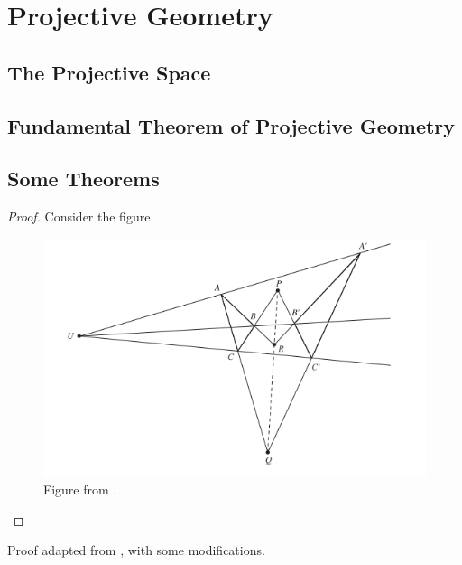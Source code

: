 \chapter{Projective Geometry}

\section{The Projective Space}

\section{Fundamental Theorem of Projective Geometry}

\section{Some Theorems}

\begin{theorem}
\end{theorem}

\begin{proof}
  Consider the figure
  \begin{figure}[H]
   \center
   \includegraphics[width=0.85\linewidth]{desargues.png}
   \caption{Figure from \cite{brannan}.}
  \end{figure}
\end{proof}

\begin{remark}
  Proof adapted from \cite{brannan}, with some modifications.
\end{remark}

\begin{theorem}

\end{theorem}

